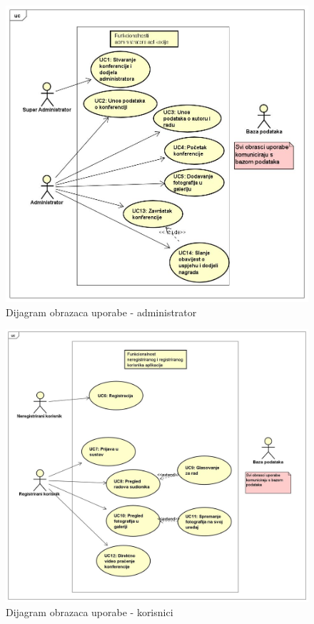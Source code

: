					\begin{figure}[H]
						\includegraphics[scale=0.45]{dijagrami/UC_dijagram_administrator.JPG} %
						\centering
						\caption{Dijagram obrazaca uporabe - administrator}
						\label{fig:promjene}
					\end{figure}
					\begin{figure}[H]
						\includegraphics[scale=0.3]{dijagrami/UC_dijagram_korisnik.JPG} %
						\centering
						\caption{Dijagram obrazaca uporabe - korisnici}
						\label{fig:promjene2}
					\end{figure}
				\eject		
				
